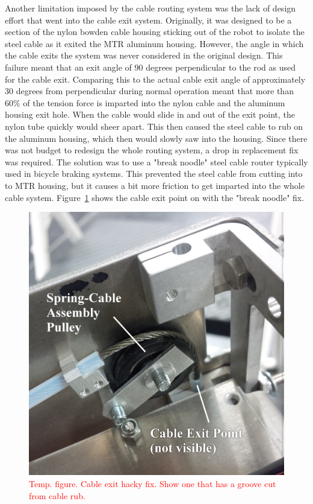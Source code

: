 Another limitation imposed by the cable routing system was the lack of design effort that went into the cable exit system.
Originally, it was designed to be a section of the nylon bowden cable housing sticking out of the robot to isolate the steel cable as it exited the MTR aluminum housing.
However, the angle in which the cable exits the system was never considered in the original \SB{} design. 
This failure meant that an exit angle of 90 degrees perpendicular to the rod as used for the cable exit.
Comparing this to the actual cable exit angle of approximately 30 degrees from perpendicular during normal operation meant that more than \(60\%\) of the tension force is imparted into the nylon cable and the aluminum housing exit hole.
When the cable would slide in and out of the exit point, the nylon tube quickly would sheer apart.
This then caused the steel cable to rub on the aluminum housing, which then would slowly saw into the housing.
Since there was not budget to redesign the whole routing system, a drop in replacement fix was required. 
The solution was to use a "break noodle" steel cable router typically used in bicycle braking systems.
This prevented the steel cable from cutting into to MTR housing, but it causes a bit more friction to get imparted into the whole cable system.
Figure~\ref{fig:cable_output} shows the cable exit point on \SB{} with the "break noodle" fix.

\begin{figure}[thpb]
      \centering
      \includegraphics[width=0.6\columnwidth]{tex/img/cable_pulley_bearing_labelled_fixedfonts}
      \caption{\textcolor{red}{Temp. figure. Cable exit hacky fix. Show one that has a groove cut from cable rub.}}
      \label{fig:cable_output}
\end{figure}

